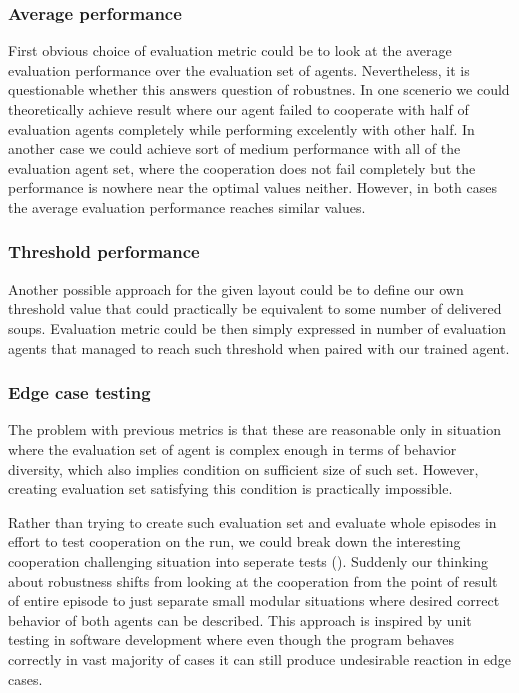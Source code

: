 \subsubsection*{Average performance}

First obvious choice of evaluation metric could be to look at the average evaluation performance over the evaluation set of agents.
Nevertheless, it is questionable whether this answers question of robustnes.
In one scenerio we could theoretically achieve result where our agent failed to cooperate with half of evaluation agents completely while performing excelently with other half.
In another case we could achieve sort of medium performance with all of the evaluation agent set, where the cooperation does not fail completely but the performance is nowhere near the optimal values neither.
However, in both cases the average evaluation performance reaches similar values.  

\subsubsection*{Threshold performance}

Another possible approach for the given layout could be to define our own threshold value that could practically be equivalent to some number of delivered soups.
Evaluation metric could be then simply expressed in number of evaluation agents that managed to reach such threshold when paired with our trained agent.

\subsubsection*{Edge case testing}
The problem with previous metrics is that these are reasonable only in situation where the evaluation set of agent is complex enough in terms of behavior diversity, which also implies condition on sufficient size of such set. 
However, creating evaluation set satisfying this condition is practically impossible.

Rather than trying to create such evaluation set and evaluate whole episodes in effort to test cooperation on the run, we could break down the interesting cooperation challenging situation into seperate tests (\cite{knott2021evaluating}).
Suddenly our thinking about robustness shifts from looking at the cooperation from the point of result of entire episode to just separate small modular situations where desired correct behavior of both agents can be described.
This approach is inspired by unit testing in software development where even though the program behaves correctly in vast majority of cases it can still produce undesirable reaction in edge cases.

